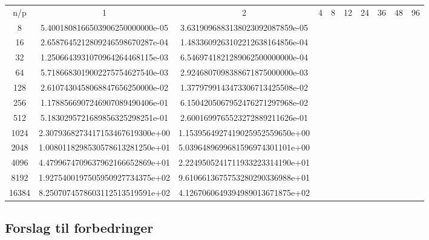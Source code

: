 \documentclass{article}
\begin{document}
\begin{table}
\begin{tabular}{c | c c c c c c c c c}

n/p & 1 & 2 & 4 & 8 & 12 & 24 & 36 & 48 & 96 \\
8 &	5.4001808166503906250000000e-05 & 3.6319096883138023092087859e-05 \\
16 &    2.6587645212809246598670287e-04 & 1.4833609263102212638164856e-04 \\
32 &    1.2506643931070964264468115e-03 & 6.5469741821289062500000000e-04 \\
64 &    5.7186683019002275754627540e-03 & 2.9246807098388671875000000e-03 \\
128 &   2.6107430458068847656250000e-02 & 1.3779799143473306713425508e-02 \\
256 &   1.1788566907246907089490406e-01 & 6.1504205067952476271297968e-02 \\
512 &   5.1830295721689856325298251e-01 & 2.6001699765523272889211626e-01 \\
1024 &  2.3079368273417153467619300e+00 & 1.1539564927419025952559650e+00 \\
2048 &  1.0080118298530578613281250e+01 & 5.0396489699681596974301101e+00 \\
4096 &	4.4799674709637962166652869e+01 & 2.2249505241711933223314190e+01 \\
8192 &	1.9275400197505950927734375e+02 & 9.6106613675753280290336988e+01 \\
16384 &	8.2507074578603112513519591e+02 & 4.1267060649394989013671875e+02 \\











\end{tabular}
\end{table}


\subsection{Forslag til forbedringer}
\end{document}

